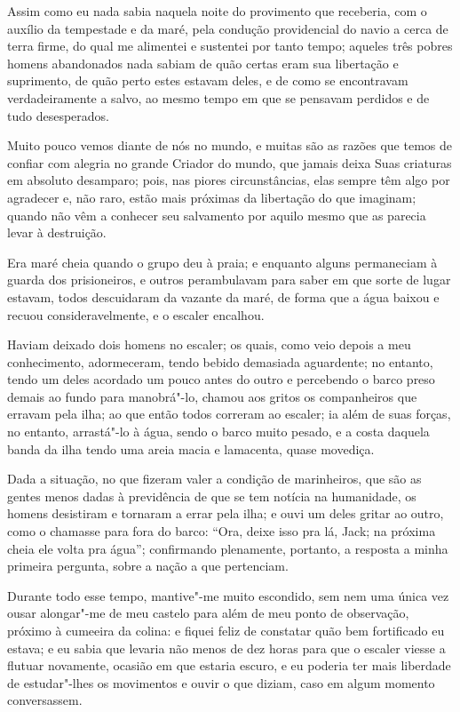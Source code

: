 Assim como eu nada sabia naquela noite do provimento que receberia, com
o auxílio da tempestade e da maré, pela condução providencial do navio a
cerca de terra firme, do qual me alimentei e sustentei por tanto tempo;
aqueles três pobres homens abandonados nada sabiam de quão certas eram
sua libertação e suprimento, de quão perto estes estavam deles, e de
como se encontravam verdadeiramente a salvo, ao mesmo tempo em que se
pensavam perdidos e de tudo desesperados.

Muito pouco vemos diante de nós no mundo, e muitas são as razões que
temos de confiar com alegria no grande Criador do mundo, que jamais
deixa Suas criaturas em absoluto desamparo; pois, nas piores
circunstâncias, elas sempre têm algo por agradecer e, não raro, estão
mais próximas da libertação do que imaginam; quando não vêm a conhecer
seu salvamento por aquilo mesmo que as parecia levar à destruição.

Era maré cheia quando o grupo deu à praia; e enquanto alguns permaneciam
à guarda dos prisioneiros, e outros perambulavam para saber em que sorte
de lugar estavam, todos descuidaram da vazante da maré, de forma que a
água baixou e recuou consideravelmente, e o escaler encalhou.

Haviam deixado dois homens no escaler; os quais, como veio depois a meu
conhecimento, adormeceram, tendo bebido demasiada aguardente; no
entanto, tendo um deles acordado um pouco antes do outro e percebendo o
barco preso demais ao fundo para manobrá"-lo, chamou aos gritos os
companheiros que erravam pela ilha; ao que então todos correram ao
escaler; ia além de suas forças, no entanto, arrastá"-lo à água, sendo o
barco muito pesado, e a costa daquela banda da ilha tendo uma areia
macia e lamacenta, quase movediça.

Dada a situação, no que fizeram valer a condição de marinheiros, que são
as gentes menos dadas à previdência de que se tem notícia na humanidade,
os homens desistiram e tornaram a errar pela ilha; e ouvi um deles
gritar ao outro, como o chamasse para fora do barco: ``Ora, deixe isso
pra lá, Jack; na próxima cheia ele volta pra água''; confirmando
plenamente, portanto, a resposta a minha primeira pergunta, sobre a
nação a que pertenciam.

Durante todo esse tempo, mantive"-me muito escondido, sem nem uma única
vez ousar alongar"-me de meu castelo para além de meu ponto de
observação, próximo à cumeeira da colina: e fiquei feliz de constatar
quão bem fortificado eu estava; e eu sabia que levaria não menos de dez
horas para que o escaler viesse a flutuar novamente, ocasião em que
estaria escuro, e eu poderia ter mais liberdade de estudar"-lhes os
movimentos e ouvir o que diziam, caso em algum momento conversassem.

